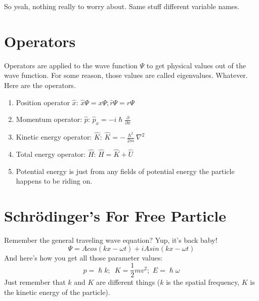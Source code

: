 \documentclass[a4paper,12pt]{report}
\begin{document}
So yeah, nothing really to worry about. Same stuff different variable names.

\section{Operators}
Operators are applied to the wave function $\Psi$ to get physical values out of the wave function. For some reason, those values are called eigenvalues. Whatever. 
Here are the operators.
\begin{enumerate}
\item Position operator $\hat{x}$: $\hat{x}\Psi = x\Psi; \hat{r}\Psi=r\Psi$
\item Momentum operator: $\hat{p}$: $\hat{p}_x=-i\hslash\frac{\partial}{\partial x}$
\item Kinetic energy operator: $\hat{K}$: $\hat{K}=-\frac{\hslash^2}{2m}\nabla^2$
\item Total energy operator: $\hat{H}$: $\hat{H} = \hat{K} + \hat{U}$
\item Potential energy is just from any fields of potential energy the particle happens to be riding on.
\end{enumerate}

\section{Schrödinger's For Free Particle}
Remember the general traveling wave equation? Yup, it's back baby!
$$\Psi=Acos(kx-\omega t)+iAsin(kx-\omega t)$$
And here's how you get all those parameter values:
$$p=\hslash k; \,\,\,K=\frac{1}{2}mv^2;\,\,E=\hslash\omega$$
Just remember that $k$ and $K$ are different things ($k$ is the spatial frequency, $K$ is the kinetic energy of the particle). 
\end{document}
